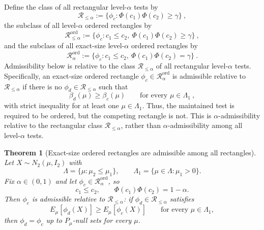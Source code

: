 \documentclass[12pt]{article}
\newtheorem{theorem}{Theorem}
\theoremstyle{definition}
\theoremstyle{remark}
\begin{document}
Define the class of all rectangular level-$\alpha$ tests by
\[
\mathcal R_{\le\alpha}
:=
\{\phi_c:\Phi(c_1)\Phi(c_2)\ge \gamma\}~,
\]
the subclass of all level-$\alpha$ ordered rectangles by
\[
\mathcal R^{\mathrm{ord}}_{\le\alpha}
:=
\{\phi_c:c_1\le c_2,\ \Phi(c_1)\Phi(c_2)\ge \gamma\}~,
\]
and the subclass of all exact-size level-$\alpha$ ordered rectangles by
\[
\mathcal R^{\mathrm{ord}}_{\alpha}
:=
\{\phi_c:c_1\le c_2,\ \Phi(c_1)\Phi(c_2)= \gamma\}~.
\]
Admissibility below is relative to the class
$\mathcal R_{\le\alpha}$ of all rectangular level-$\alpha$ tests.
Specifically, an exact-size ordered rectangle
$\phi_c\in\mathcal R^{\mathrm{ord}}_{\alpha}$ is admissible relative to
$\mathcal R_{\le\alpha}$ if there is no
$\phi_d\in\mathcal R_{\le\alpha}$ such that
\[
\beta_d(\mu)\ge \beta_c(\mu)
\qquad\text{for every }\mu\in\Lambda_1~,
\]
with strict inequality for at least one $\mu\in\Lambda_1$.
Thus, the maintained test is required to be ordered, but the competing
rectangle is not. This is $\alpha$-admissibility relative to the rectangular class
$\mathcal R_{\le\alpha}$, rather than $\alpha$-admissibility among all
level-$\alpha$ tests.
 
\begin{theorem}[Exact-size ordered rectangles are admissible among all rectangles]\label{thm:ordered-rectangle-admissibility}
    Let $X\sim N_2(\mu,I_2)$ with
    \[
    \Lambda=\{\mu:\mu_2\le\mu_1\},
    \qquad
    \Lambda_1=\{\mu\in\Lambda:\mu_1>0\}.
    \]
    Fix $\alpha\in(0,1)$ and let $\phi_c\in\mathcal R^{\mathrm{ord}}_{\alpha}$, so
    \[
    c_1\le c_2,
    \qquad
    \Phi(c_1)\Phi(c_2)=1-\alpha.
    \]
    Then $\phi_c$ is admissible relative to $\mathcal R_{\le\alpha}$: if $\phi_d\in\mathcal R_{\le\alpha}$ satisfies
    \[
    E_\mu[\phi_d(X)]\ge E_\mu[\phi_c(X)]
    \qquad\text{for every }\mu\in\Lambda_1,
    \]
    then $\phi_d=\phi_c$ up to $P_\mu$-null sets for every $\mu$.
\end{theorem}
 
\end{document}
